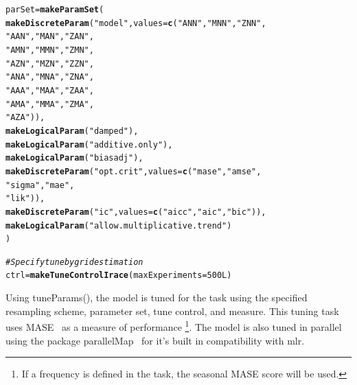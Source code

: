 \documentclass[12pt]{article}\usepackage[]{graphicx}\usepackage[]{color}
\makeatletter
\newcommand{\hlnum}[1]{\textcolor[rgb]{0.686,0.059,0.569}{#1}}%
\newcommand{\hlstr}[1]{\textcolor[rgb]{0.192,0.494,0.8}{#1}}%
\newcommand{\hlcom}[1]{\textcolor[rgb]{0.678,0.584,0.686}{\textit{#1}}}%
\newcommand{\hlstd}[1]{\textcolor[rgb]{0.345,0.345,0.345}{#1}}%
\newcommand{\hlkwb}[1]{\textcolor[rgb]{0.69,0.353,0.396}{#1}}%
\newcommand{\hlkwc}[1]{\textcolor[rgb]{0.333,0.667,0.333}{#1}}%
\newcommand{\hlkwd}[1]{\textcolor[rgb]{0.737,0.353,0.396}{\textbf{#1}}}%
\newenvironment{kframe}{%
 \def\at@end@of@kframe{}%
 \ifinner\ifhmode%
  \def\at@end@of@kframe{\end{minipage}}%
  \begin{minipage}{\columnwidth}%
 \fi\fi%
 \def\FrameCommand##1{\hskip\@totalleftmargin \hskip-\fboxsep
 \colorbox{shadecolor}{##1}\hskip-\fboxsep
     \hskip-\linewidth \hskip-\@totalleftmargin \hskip\columnwidth}%
 \MakeFramed {\advance\hsize-\width
   \@totalleftmargin\z@ \linewidth\hsize
   \@setminipage}}%
 {\par\unskip\endMakeFramed%
 \at@end@of@kframe}
\newenvironment{knitrout}{}{} %
\theoremstyle{definition}
\newcommand\code{\@codex}
\def\@codex#1{{\normalfont\ttfamily\hyphenchar\font=-1 #1}}
\newcommand{\pkg}[1]{{\fontseries{b}\selectfont #1}}
\makeatother
\begin{document}
\singlespacing
\begin{knitrout}
\color{fgcolor}\begin{kframe}
\begin{alltt}
\hlstd{parSet} \hlkwb{=} \hlkwd{makeParamSet}\hlstd{(}
  \hlkwd{makeDiscreteParam}\hlstd{(}\hlstr{"model"}\hlstd{,} \hlkwc{values} \hlstd{=} \hlkwd{c}\hlstd{(}\hlstr{"ANN"}\hlstd{,} \hlstr{"MNN"}\hlstd{,} \hlstr{"ZNN"}\hlstd{,}
                                        \hlstr{"AAN"}\hlstd{,} \hlstr{"MAN"}\hlstd{,} \hlstr{"ZAN"}\hlstd{,}
                                        \hlstr{"AMN"}\hlstd{,} \hlstr{"MMN"}\hlstd{,} \hlstr{"ZMN"}\hlstd{,}
                                        \hlstr{"AZN"}\hlstd{,} \hlstr{"MZN"}\hlstd{,} \hlstr{"ZZN"}\hlstd{,}
                                        \hlstr{"ANA"}\hlstd{,} \hlstr{"MNA"}\hlstd{,} \hlstr{"ZNA"}\hlstd{,}
                                        \hlstr{"AAA"}\hlstd{,} \hlstr{"MAA"}\hlstd{,} \hlstr{"ZAA"}\hlstd{,}
                                        \hlstr{"AMA"}\hlstd{,} \hlstr{"MMA"}\hlstd{,} \hlstr{"ZMA"}\hlstd{,}
                                        \hlstr{"AZA"}\hlstd{)),}
  \hlkwd{makeLogicalParam}\hlstd{(}\hlstr{"damped"}\hlstd{),}
  \hlkwd{makeLogicalParam}\hlstd{(}\hlstr{"additive.only"}\hlstd{),}
  \hlkwd{makeLogicalParam}\hlstd{(}\hlstr{"biasadj"}\hlstd{),}
  \hlkwd{makeDiscreteParam}\hlstd{(}\hlstr{"opt.crit"}\hlstd{,} \hlkwc{values} \hlstd{=} \hlkwd{c}\hlstd{(}\hlstr{"mase"}\hlstd{,} \hlstr{"amse"}\hlstd{,}
                                           \hlstr{"sigma"}\hlstd{,} \hlstr{"mae"}\hlstd{,}
                                           \hlstr{"lik"}\hlstd{)),}
  \hlkwd{makeDiscreteParam}\hlstd{(}\hlstr{"ic"}\hlstd{,} \hlkwc{values} \hlstd{=} \hlkwd{c}\hlstd{(}\hlstr{"aicc"}\hlstd{,} \hlstr{"aic"}\hlstd{,} \hlstr{"bic"}\hlstd{)),}
  \hlkwd{makeLogicalParam}\hlstd{(}\hlstr{"allow.multiplicative.trend"}\hlstd{)}
\hlstd{)}

\hlcom{#Specify tune by grid estimation}
\hlstd{ctrl} \hlkwb{=} \hlkwd{makeTuneControlIrace}\hlstd{(}\hlkwc{maxExperiments} \hlstd{=} \hlnum{500L}\hlstd{)}
\end{alltt}
\end{kframe}
\end{knitrout}
\doublespacing

Using \code{tuneParams()}, the model is tuned for the task using the specified resampling scheme, parameter set, tune control, and measure. This tuning task uses MASE~\cite{Hyndman2006} as a measure of performance \footnote{If a frequency is defined in the task, the seasonal MASE score will be used.}. The model is also tuned in parallel using the package \pkg{parallelMap}~\cite{parallel} for it's built in compatibility with \pkg{mlr}.
\end{document}
